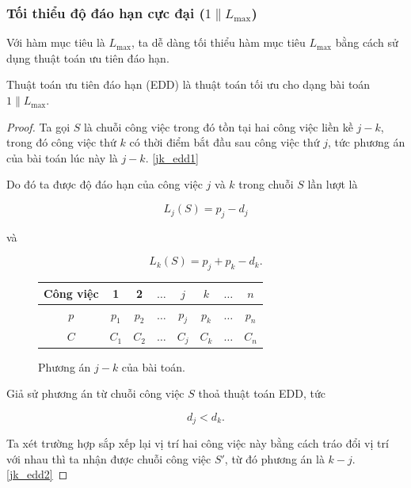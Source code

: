 \subsubsection*{Tối thiểu độ đáo hạn cực đại ($1 \| L_{\max}$)}
Với hàm mục tiêu là $L_{\max}$, ta dễ dàng tối thiểu hàm mục tiêu $L_{\max}$ bằng cách sử dụng thuật toán ưu tiên đáo hạn.

\begin{dl}
	Thuật toán ưu tiên đáo hạn (EDD) là thuật toán tối ưu cho dạng bài toán $1 \| L_{\max}$.
\end{dl}

\begin{proof}

	Ta gọi $S$ là chuỗi công việc trong đó tồn tại hai công việc liền kề $j - k$, trong đó công việc thứ $k$ có thời điểm bắt đầu sau công việc thứ $j$, tức phương án của bài toán lúc này là $j - k$. \eqref{jk_edd1}
	
	Do đó ta được độ đáo hạn của công việc $j$ và $k$ trong chuỗi $S$ lần lượt là

	\begin{equation} \label{LjS}
		L_j(S) = p_j - d_j
	\end{equation}

	và

	\begin{equation} \label{LkS}
		L_k(S) = p_j + p_k - d_k.
	\end{equation}

	\begin{figure}[h!]
		\centering
		 \begin{tabular}{|c | c c c c c c c |} 
		 \hline
		 Công việc & 1 & 2 & $\ldots$ & $j$ & $k$ & $\ldots$ & $n$ \\
		 \hline\hline
		 $p$ & $p_1$ & $p_2$ & $\ldots$ & $p_j$ & $p_k$ & $\ldots$ & $p_n$ \\
		 $C$ & $C_1$ & $C_2$ & $\ldots$ & $C_j$ & $C_k$ & $\ldots$ & $C_n$ \\
		 \hline
		 \end{tabular}
	\caption{\label{jk_edd1}Phương án $j - k$ của bài toán.}
	\end{figure}

	Giả sử phương án từ chuỗi công việc $S$ thoả thuật toán EDD, tức

	\begin{equation} \label{dj<dk}
		d_j < d_k.
	\end{equation}

	Ta xét trường hợp sắp xếp lại vị trí hai công việc này bằng cách tráo đổi vị trí với nhau thì ta nhận được chuỗi công việc $S'$, từ đó phương án là $k - j$. \eqref{jk_edd2}


\end{proof}
